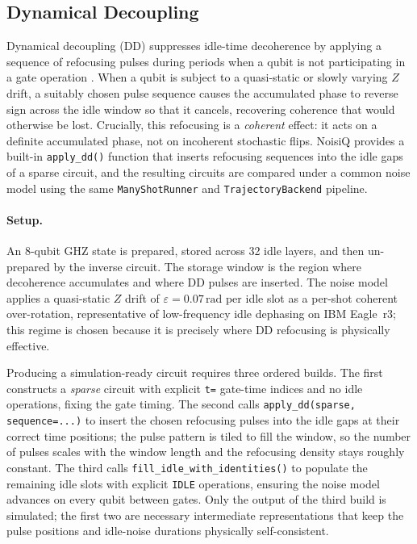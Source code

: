 \documentclass[10pt,twocolumn]{article}
\begin{document}
\subsection{Dynamical Decoupling}
\label{subsec:DD}
Dynamical decoupling (DD) suppresses idle-time decoherence by applying
a sequence of refocusing pulses during periods when a qubit is not
participating in a gate operation \cite{viola1999dynamical}.
When a qubit is subject to a quasi-static or slowly varying $Z$ drift,
a suitably chosen pulse sequence causes the accumulated phase to reverse
sign across the idle window so that it cancels, recovering coherence that
would otherwise be lost. Crucially, this refocusing is a \textit{coherent}
effect: it acts on a definite accumulated phase, not on incoherent
stochastic flips. NoisiQ provides a built-in \texttt{apply\_dd()} function
that inserts refocusing sequences into the idle gaps of a sparse circuit,
and the resulting circuits are compared under a common noise model using
the same \texttt{ManyShotRunner} and \texttt{TrajectoryBackend} pipeline.

\paragraph{Setup.}
An 8-qubit GHZ state is prepared, stored across 32 idle layers, and then
un-prepared by the inverse circuit. The storage window is the region where
decoherence accumulates and where DD pulses are inserted. The noise model
applies a quasi-static $Z$ drift of $\varepsilon = 0.07\,\text{rad}$ per
idle slot as a per-shot coherent over-rotation, representative of
low-frequency idle dephasing on IBM Eagle~r3; this regime is chosen
because it is precisely where DD refocusing is physically effective.

Producing a simulation-ready circuit requires three ordered builds. The
first constructs a \textit{sparse} circuit with explicit \texttt{t=}
gate-time indices and no idle operations, fixing the gate timing. The
second calls \texttt{apply\_dd(sparse, sequence=...)} to insert the chosen
refocusing pulses into the idle gaps at their correct time positions; the
pulse pattern is tiled to fill the window, so the number of pulses scales
with the window length and the refocusing density stays roughly constant.
The third calls \texttt{fill\_idle\_with\_identities()} to populate the
remaining idle slots with explicit \texttt{IDLE} operations, ensuring the
noise model advances on every qubit between gates. Only the output of the
third build is simulated; the first two are necessary intermediate
representations that keep the pulse positions and idle-noise durations
physically self-consistent.
\end{document}
